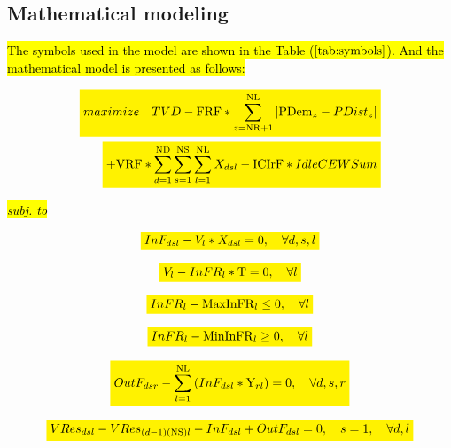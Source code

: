 \documentclass{singlecol}
\newcommand{\mathcolorbox}[2]{\colorbox{#1}{$\displaystyle #2$}}
\theoremstyle{TH}{
\newtheorem{lemma}{Lemma}
\newtheorem{theorem}[lemma]{Theorem}
\newtheorem{corrolary}[lemma]{Corrolary}
\newtheorem{conjecture}[lemma]{Conjecture}
\newtheorem{proposition}[lemma]{Proposition}
\newtheorem{claim}[lemma]{Claim}
\newtheorem{stheorem}[lemma]{Wrong Theorem}
\newtheorem{algorithm}{Algorithm}
}
\theoremstyle{THrm}{
\newtheorem{definition}{Definition}[section]
\newtheorem{question}{Question}[section]
\newtheorem{remark}{Remark}
\newtheorem{scheme}{Scheme}
}
\theoremstyle{THhit}{
\newtheorem{case}{Case}[section]
}
\begin{document}
\subsection{Mathematical modeling}
\label{sec:problemModel}
 
\hl{The symbols used in the model are shown in the Table (}\mathcolorbox{yellow}{\ref{tab:symbols}}\hl{). And the mathematical model is presented as follows:}

\begin{eqnarray} 
\label{eq:objFunc}
	 \mathcolorbox{yellow}{maximize \quad TVD - \mathrm{FRF}*\sum_{z=\mathrm{NR}+1}^{\mathrm{NL}}{|\mathrm{PDem}_{z} - PDist_{z}|}} \\ \nonumber 
	\mathcolorbox{yellow}{+ \mathrm{VRF} * \sum_{d=1}^{\mathrm{ND}}{\sum_{s=1}^{\mathrm{NS}}{\sum_{l=1}^{\mathrm{NL}}{X_{dsl}}}} - \mathrm{ICIrF}*IdleCEWSum}
\end{eqnarray}

\hl{\emph{subj. to}}

\begin{equation}
	\mathcolorbox{yellow}{InF_{dsl} - V_{l} * X_{dsl} = 0, \quad \forall{d, s, l}}
	\label{eq:evalInF}
\end{equation}

\begin{equation}
	\mathcolorbox{yellow}{V_l - {InFR}_l * \mathrm{T} = 0, \quad \forall{l}}
	\label{eq:evalnFR}
\end{equation}

\begin{equation}
	\mathcolorbox{yellow}{{InFR}_l - \mathrm{MaxInFR}_{l} \leq 0, \quad \forall{l}}
	\label{eq:evalMaxInfR}
\end{equation} 

\begin{equation}
	\mathcolorbox{yellow}{{InFR}_l - \mathrm{MinInFR}_{l} \geq 0, \quad \forall{l}}
	\label{eq:evalMinInfR}
\end{equation}

\begin{equation} 
	\mathcolorbox{yellow}{OutF_{dsr} - \sum_{l=1}^{\mathrm{NL}}{(InF_{dsl}*\mathrm{Y}_{rl})} = 0, \quad \forall{d, s, r}}
	 \label{eq:evalOutFRes}
\end{equation}

\begin{equation}
	\mathcolorbox{yellow}{VRes_{dsl} - VRes_{(d-1)(\mathrm{NS})l} - InF_{dsl} + OutF_{dsl} = 0, \quad s=1, \quad \forall{d,l}}
 	\label{eq:volResT1}
\end{equation}
\end{document}
